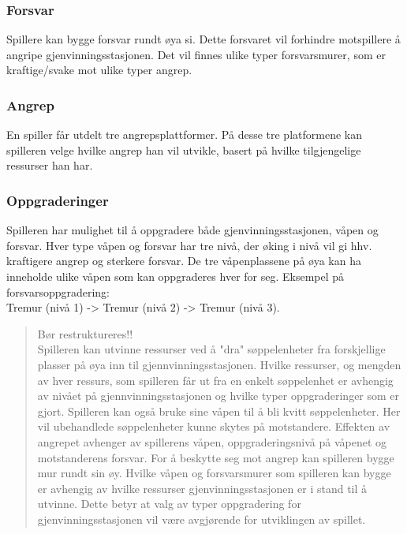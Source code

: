\subsubsection{Forsvar}
Spillere kan bygge forsvar rundt øya si. Dette forsvaret vil forhindre
motspillere å angripe gjenvinningsstasjonen. Det vil finnes ulike typer
forsvarsmurer, som er kraftige/svake mot ulike typer angrep.
\subsubsection{Angrep}
En spiller får utdelt tre angrepsplattformer. På desse tre platformene
kan spilleren velge hvilke angrep han vil utvikle, basert på hvilke
tilgjengelige ressurser han har.
\subsubsection{Oppgraderinger}
Spilleren har mulighet til å oppgradere både gjenvinningsstasjonen,
våpen og forsvar. Hver type våpen og forsvar har tre nivå, der øking i
nivå vil gi hhv. kraftigere angrep og sterkere forsvar. De tre
våpenplassene på øya kan ha inneholde ulike våpen som kan oppgraderes
hver for seg.
Eksempel på forsvarsoppgradering:\\
Tremur (nivå 1) -> Tremur (nivå 2) -> Tremur (nivå 3).
\begin{quote}
Bør restruktureres!!\\
Spilleren kan utvinne ressurser ved å "dra" søppelenheter fra
forskjellige plasser på øya inn til gjennvinningsstasjonen. Hvilke
ressurser, og mengden av hver ressurs, som spilleren får ut fra en
enkelt søppelenhet er avhengig av nivået på gjennvinningsstasjonen og
hvilke typer oppgraderinger som er gjort. Spilleren kan også bruke sine
våpen til å bli kvitt søppelenheter. Her vil ubehandlede søppelenheter
kunne skytes på motstandere. Effekten av angrepet avhenger av spillerens
våpen, oppgraderingsnivå på våpenet og motstanderens forsvar. For å
beskytte seg mot angrep kan spilleren bygge mur rundt sin øy. Hvilke
våpen og forsvarsmurer som spilleren kan bygge er avhengig av hvilke
ressurser gjenvinningsstasjonen er i stand til å utvinne. Dette betyr at
valg av typer oppgradering for gjenvinningsstasjonen vil være avgjørende
for utviklingen av spillet.\\
\end{quote}
